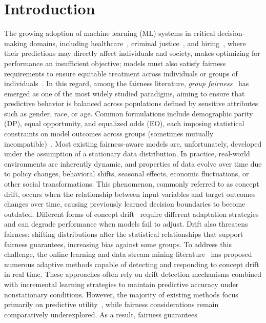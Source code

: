 \documentclass[conference]{IEEEtran}
\begin{document}
\section{Introduction}
\label{sec:intro}
The growing adoption of machine learning (ML) systems in critical decision-making domains, including healthcare~\cite{8474918}, criminal
justice~\cite{10467221}, and hiring~\cite{10.1145/3351095.3372828}, where their predictions may directly affect individuals and society, makes optimizing for
performance an insufficient objective; models must also satisfy fairness requirements to ensure equitable treatment across individuals or groups of
individuals~\cite{10.1145/3457607}. In this regard, among the fairness literature, \emph{group fairness}~\cite{10.1145/2090236.2090255} has emerged as one of the most
widely studied paradigms, aiming to ensure that predictive behavior is balanced across populations defined by sensitive attributes such as gender, race, or age.
Common formulations include demographic parity (DP), equal opportunity, and equalized odds (EO), each imposing statistical constraints on model outcomes across
groups (sometimes mutually incompatible)~\cite{10.1145/2090236.2090255,NIPS2016_6a9659fe}. Most existing fairness-aware models are, unfortunately, developed under the
assumption of a stationary data distribution. In practice, real-world environments are inherently dynamic, and properties of data evolve over
time due to policy changes, behavioral shifts, seasonal effects, economic fluctuations, or other social transformations. This phenomenon, commonly referred to as
concept drift, occurs when the relationship between input variables and target outcomes changes over time, causing previously learned decision boundaries to
become outdated. Different forms of concept drift~\cite{DBLP:journals/corr/WebbHCNP15} require different adaptation strategies and can degrade performance when
models fail to adjust. Drift also threatens fairness: shifting distributions alter the statistical relationships that support fairness guarantees, increasing bias
against some groups. To address this challenge, the online learning and data stream mining literature~\cite{1315451.1315460} has proposed numerous adaptive methods capable of detecting
and responding to concept drift in real time. These approaches often rely on drift detection mechanisms combined with incremental learning strategies to maintain
predictive accuracy under nonstationary conditions. However, the majority of existing methods focus primarily on predictive
utility~\cite{10.1007/s10994-017-5642-8,KLAIBER20231261}, while fairness considerations remain comparatively underexplored. As a result, fairness guarantees
\end{document}
